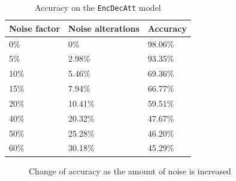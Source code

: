 \begin{table}[H]
    \centering
    \begin{tabular}{|l|l|l|}
        \hline 
        \textbf{Noise factor}          & \textbf{Noise alterations}       & \textbf{Accuracy}         \\ \hline
        0\%                            & 0\%                              & 98.06\%                   \\ \hline
        5\%                            & 2.98\%                           & 93.35\%                   \\ \hline
        10\%                           & 5.46\%                           & 69.36\%                   \\ \hline
        15\%                           & 7.94\%                           & 66.77\%                   \\ \hline
        20\%                           & 10.41\%                          & 59.51\%                   \\ \hline
        40\%                           & 20.32\%                          & 47.67\%                   \\ \hline
        50\%                           & 25.28\%                          & 46.20\%                   \\ \hline
        60\%                           & 30.18\%                          & 45.29\%                   \\ \hline
    \end{tabular}
    \caption{Accuracy on the {\tt EncDecAtt} model}
    \label{table:noise_accuracy}
\end{table}

\begin{figure}[H]
    \centering
    \captionsetup{justification=centering}
    \caption{Change of accuracy as the amount of noise is increased}
    \label{fig:noise_accuracy}
\end{figure}

